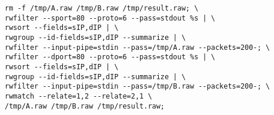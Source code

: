 \begin{lstlisting}
rm -f /tmp/A.raw /tmp/B.raw /tmp/result.raw; \
rwfilter --sport=80 --proto=6 --pass=stdout %s | \
rwsort --fields=sIP,dIP | \
rwgroup --id-fields=sIP,dIP --summarize | \
rwfilter --input-pipe=stdin --pass=/tmp/A.raw --packets=200-; \
rwfilter --dport=80 --proto=6 --pass=stdout %s | \
rwsort --fields=sIP,dIP | \
rwgroup --id-fields=sIP,dIP --summarize | \
rwfilter --input-pipe=stdin --pass=/tmp/B.raw --packets=200-; \
rwmatch --relate=1,2 --relate=2,1 \
/tmp/A.raw /tmp/B.raw /tmp/result.raw;
\end{lstlisting}
